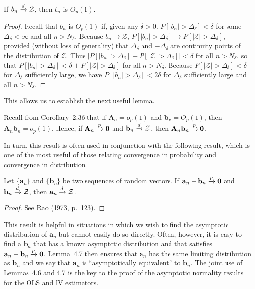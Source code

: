 \begin{lemma}\label{lem:4.5}
If $b_n \xrightarrow{d} \mathcal{Z}$, then $b_n$ is $O_p(1)$.
\end{lemma}

\begin{proof}
Recall that $b_n$ is $O_p(1)$ if, given any $\delta > 0$, $P[|b_n| > \Delta_\delta] < \delta$
for some $\Delta_\delta < \infty$ and all $n > N_\delta$. Because $b_n \to \mathcal{Z}$, $P[|b_n| > \Delta_\delta] \to
P[|\mathcal{Z}| > \Delta_\delta]$, provided (without loss of generality) that $\Delta_\delta$ and $-\Delta_\delta$ are
continuity points of the distribution of $\mathcal{Z}$. Thus $|P[|b_n| > \Delta_\delta] - P[|\mathcal{Z}| >
\Delta_\delta]| < \delta$ for all $n > N_\delta$, so that $P[|b_n| > \Delta_\delta] < \delta + P[|\mathcal{Z}| > \Delta_\delta]$ for
all $n > N_\delta$. Because $P[|\mathcal{Z}| > \Delta_\delta] < \delta$ for $\Delta_\delta$ sufficiently large, we have
$P[|b_n| > \Delta_\delta] < 2\delta$ for $\Delta_\delta$ sufficiently large and all $n > N_\delta$.
\end{proof}

This allows us to establish the next useful lemma.

\begin{lemma}\label{lem:4.6}
Recall from Corollary~2.36 that if $\mathbf{A}_n = o_p(1)$ and $\mathbf{b}_n = O_p(1)$, then $\mathbf{A}_n \mathbf{b}_n = o_p(1)$. Hence, if $\mathbf{A}_n \xrightarrow{p} \mathbf{0}$ and $\mathbf{b}_n \xrightarrow{d} \mathcal{Z}$, then $\mathbf{A}_n \mathbf{b}_n \xrightarrow{p} \mathbf{0}$.
\end{lemma}

In turn, this result is often used in conjunction with the following result,
which is one of the most useful of those relating convergence in probability
and convergence in distribution.

\begin{lemma}\label{lem:4.7}
Let $\{\mathbf{a}_n\}$ and $\{\mathbf{b}_n\}$ be two sequences of random vectors. If $\mathbf{a}_n - \mathbf{b}_n \xrightarrow{p} \mathbf{0}$ and $\mathbf{b}_n \xrightarrow{d} \mathcal{Z}$, then $\mathbf{a}_n \xrightarrow{d} \mathcal{Z}$.
\end{lemma}

\begin{proof}
See Rao (1973, p.~123).
\end{proof}

This result is helpful in situations in which we wish to find the asymptotic
distribution of $\mathbf{a}_n$ but cannot easily do so directly. Often, however, it is easy
to find a $\mathbf{b}_n$ that has a known asymptotic distribution and that satisfies
$\mathbf{a}_n - \mathbf{b}_n \xrightarrow{p} \mathbf{0}$. Lemma~4.7 then ensures that $\mathbf{a}_n$ has the same limiting
distribution as $\mathbf{b}_n$ and we say that $\mathbf{a}_n$ is ``asymptotically equivalent'' to
$\mathbf{b}_n$. The joint use of Lemmas~4.6 and 4.7 is the key to the proof of the
asymptotic normality results for the OLS and IV estimators.

